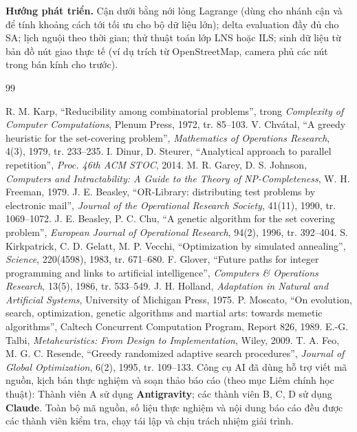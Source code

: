 \documentclass[a4paper,12pt]{article}
\begin{document}
\textbf{Hướng phát triển.} Cận dưới bằng nới lỏng Lagrange (dùng cho nhánh cận và để tính khoảng cách tới tối ưu cho bộ dữ liệu lớn); delta evaluation đầy đủ cho SA; lịch nguội theo thời gian; thử thuật toán lớp LNS hoặc ILS; sinh dữ liệu từ bản đồ nút giao thực tế (ví dụ trích từ OpenStreetMap, camera phủ các nút trong bán kính cho trước).

\begin{thebibliography}{99}
 R. M. Karp, ``Reducibility among combinatorial problems'', trong \textit{Complexity of Computer Computations}, Plenum Press, 1972, tr. 85--103.
 V. Chvátal, ``A greedy heuristic for the set-covering problem'', \textit{Mathematics of Operations Research}, 4(3), 1979, tr. 233--235.
 I. Dinur, D. Steurer, ``Analytical approach to parallel repetition'', \textit{Proc. 46th ACM STOC}, 2014.
 M. R. Garey, D. S. Johnson, \textit{Computers and Intractability: A Guide to the Theory of NP-Completeness}, W. H. Freeman, 1979.
 J. E. Beasley, ``OR-Library: distributing test problems by electronic mail'', \textit{Journal of the Operational Research Society}, 41(11), 1990, tr. 1069--1072.
 J. E. Beasley, P. C. Chu, ``A genetic algorithm for the set covering problem'', \textit{European Journal of Operational Research}, 94(2), 1996, tr. 392--404.
 S. Kirkpatrick, C. D. Gelatt, M. P. Vecchi, ``Optimization by simulated annealing'', \textit{Science}, 220(4598), 1983, tr. 671--680.
 F. Glover, ``Future paths for integer programming and links to artificial intelligence'', \textit{Computers \& Operations Research}, 13(5), 1986, tr. 533--549.
 J. H. Holland, \textit{Adaptation in Natural and Artificial Systems}, University of Michigan Press, 1975.
 P. Moscato, ``On evolution, search, optimization, genetic algorithms and martial arts: towards memetic algorithms'', Caltech Concurrent Computation Program, Report 826, 1989.
 E.-G. Talbi, \textit{Metaheuristics: From Design to Implementation}, Wiley, 2009.
 T. A. Feo, M. G. C. Resende, ``Greedy randomized adaptive search procedures'', \textit{Journal of Global Optimization}, 6(2), 1995, tr. 109--133.
 Công cụ AI đã dùng hỗ trợ viết mã nguồn, kịch bản thực nghiệm và soạn thảo báo cáo (theo mục Liêm chính học thuật): Thành viên A sử dụng \textbf{Antigravity}; các thành viên B, C, D sử dụng \textbf{Claude}. Toàn bộ mã nguồn, số liệu thực nghiệm và nội dung báo cáo đều được các thành viên kiểm tra, chạy tái lập và chịu trách nhiệm giải trình.
\end{thebibliography}
\end{document}
